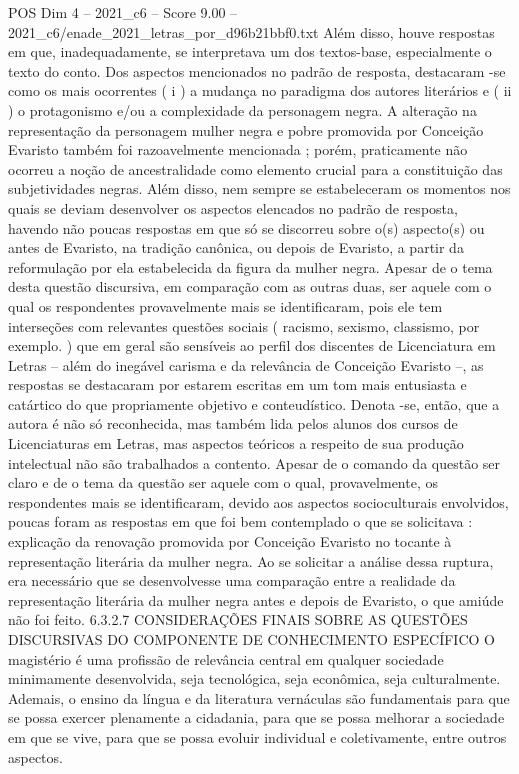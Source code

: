 \begin{textsample}{POS Dim 4 – 2021\_c6 – Score 9.00 – 2021\_c6/enade\_2021\_letras\_por\_d96b21bbf0.txt}
Além disso, houve respostas em que, inadequadamente, se interpretava um dos textos-base, especialmente o texto do conto.
Dos aspectos mencionados no padrão de resposta, destacaram -se como os mais ocorrentes ( i ) a mudança no paradigma dos autores literários e ( ii ) o protagonismo e/ou a complexidade da personagem negra.
A alteração na representação da personagem mulher negra e pobre promovida por Conceição Evaristo também foi razoavelmente mencionada ; porém, praticamente não ocorreu a noção de ancestralidade como elemento crucial para a constituição das subjetividades negras.
Além disso, nem sempre se estabeleceram os momentos nos quais se deviam desenvolver os aspectos elencados no padrão de resposta, havendo não poucas respostas em que só se discorreu sobre o(s) aspecto(s) ou antes de Evaristo, na tradição canônica, ou depois de Evaristo, a partir da reformulação por ela estabelecida da figura da mulher negra.
Apesar de o tema desta questão discursiva, em comparação com as outras duas, ser aquele com o qual os respondentes provavelmente mais se identificaram, pois ele tem interseções com relevantes questões sociais ( racismo, sexismo, classismo, por exemplo. ) que em geral são sensíveis ao perfil dos discentes de Licenciatura em Letras – além do inegável carisma e da relevância de Conceição Evaristo –, as respostas se destacaram por estarem escritas em um tom mais entusiasta e catártico do que propriamente objetivo e conteudístico.
Denota -se, então, que a autora é não só reconhecida, mas também lida pelos alunos dos cursos de Licenciaturas em Letras, mas aspectos teóricos a respeito de sua produção intelectual não são trabalhados a contento.
Apesar de o comando da questão ser claro e de o tema da questão ser aquele com o qual, provavelmente, os respondentes mais se identificaram, devido aos aspectos socioculturais envolvidos, poucas foram as respostas em que foi bem contemplado o que se solicitava : explicação da renovação promovida por Conceição Evaristo no tocante à representação literária da mulher negra.
Ao se solicitar a análise dessa ruptura, era necessário que se desenvolvesse uma comparação entre a realidade da representação literária da mulher negra antes e depois de Evaristo, o que amiúde não foi feito. 6.3.2.7 CONSIDERAÇÕES FINAIS SOBRE AS QUESTÕES DISCURSIVAS DO COMPONENTE DE CONHECIMENTO ESPECÍFICO O magistério é uma profissão de relevância central em qualquer sociedade minimamente desenvolvida, seja tecnológica, seja econômica, seja culturalmente.
Ademais, o ensino da língua e da literatura vernáculas são fundamentais para que se possa exercer plenamente a cidadania, para que se possa melhorar a sociedade em que se vive, para que se possa evoluir individual e coletivamente, entre outros aspectos.

\end{textsample}
